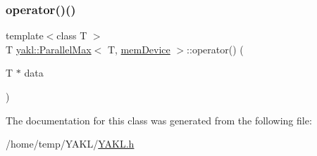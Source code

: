 \mbox{\label{classyakl_1_1ParallelMax_3_01T_00_01memDevice_01_4_a8cef2b628c4131ead6e82735b73ee1f4}} 
\subsubsection{\texorpdfstring{operator()()}{operator()()}}
{\footnotesize\ttfamily template$<$class T $>$ \\
T \hyperlink{classyakl_1_1ParallelMax}{yakl\+::\+Parallel\+Max}$<$ T, \hyperlink{namespaceyakl_ac3c32aec58c61e7f870081477ceee883}{mem\+Device} $>$\+::operator() (\begin{DoxyParamCaption}\item[{T $\ast$}]{data }\end{DoxyParamCaption})\hspace{0.3cm}{\ttfamily [inline]}}



The documentation for this class was generated from the following file\+:\begin{DoxyCompactItemize}
\item 
/home/temp/\+Y\+A\+K\+L/\hyperlink{YAKL_8h}{Y\+A\+K\+L.\+h}\end{DoxyCompactItemize}
